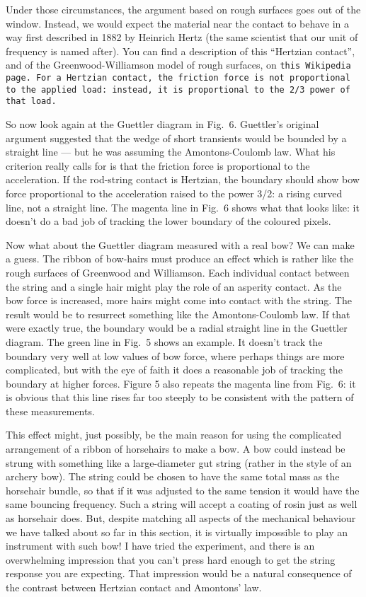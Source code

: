   Under those circumstances, the argument based on rough surfaces goes out of 
  the window. Instead, we would expect the material near the contact to behave 
  in a way first described in 1882 by Heinrich Hertz (the same scientist that 
  our unit of frequency is named after). You can find a description of this 
  “Hertzian contact”, and of the Greenwood-Williamson model of rough surfaces, 
  on \tt{}this Wikipedia page\rm{}. For a Hertzian contact, the friction force 
  is not proportional to the applied load: instead, it is proportional to the 
  2/3 power of that load. 

  So now look again at the Guettler diagram in Fig.\ 6. Guettler’s original 
  argument suggested that the wedge of short transients would be bounded by a 
  straight line — but he was assuming the Amontons-Coulomb law. What his 
  criterion really calls for is that the friction force is proportional to the 
  acceleration. If the rod-string contact is Hertzian, the boundary should show 
  bow force proportional to the acceleration raised to the power 3/2: a rising 
  curved line, not a straight line. The magenta line in Fig.\ 6 shows what that 
  looks like: it doesn’t do a bad job of tracking the lower boundary of the 
  coloured pixels. 

  Now what about the Guettler diagram measured with a real bow? We can make a 
  guess. The ribbon of bow-hairs must produce an effect which is rather like 
  the rough surfaces of Greenwood and Williamson. Each individual contact 
  between the string and a single hair might play the role of an asperity 
  contact. As the bow force is increased, more hairs might come into contact 
  with the string. The result would be to resurrect something like the 
  Amontons-Coulomb law. If that were exactly true, the boundary would be a 
  radial straight line in the Guettler diagram. The green line in Fig.\ 5 shows 
  an example. It doesn’t track the boundary very well at low values of bow 
  force, where perhaps things are more complicated, but with the eye of faith 
  it does a reasonable job of tracking the boundary at higher forces. Figure 5 
  also repeats the magenta line from Fig.\ 6: it is obvious that this line 
  rises far too steeply to be consistent with the pattern of these 
  measurements. 

  This effect might, just possibly, be the main reason for using the 
  complicated arrangement of a ribbon of horsehairs to make a bow. A bow could 
  instead be strung with something like a large-diameter gut string (rather in 
  the style of an archery bow). The string could be chosen to have the same 
  total mass as the horsehair bundle, so that if it was adjusted to the same 
  tension it would have the same bouncing frequency. Such a string will accept 
  a coating of rosin just as well as horsehair does. But, despite matching all 
  aspects of the mechanical behaviour we have talked about so far in this 
  section, it is virtually impossible to play an instrument with such bow! I 
  have tried the experiment, and there is an overwhelming impression that you 
  can’t press hard enough to get the string response you are expecting. That 
  impression would be a natural consequence of the contrast between Hertzian 
  contact and Amontons' law. 

